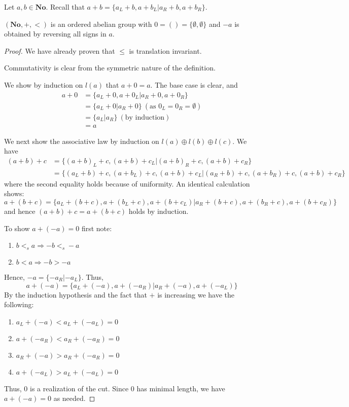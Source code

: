 

Let $a,b\in \mathbf{No}$. Recall that $a + b = \{a_L + b, a + b_L | a_R + b, a + b_R \}$.

\begin{theorem} %
$(\mathbf{No},+,<)$ is an ordered abelian group with $0 = () = \{\emptyset, \emptyset \}$ and $-a$ is obtained by reversing all signs in $a$.
\end{theorem}


\begin{proof}
We have already proven that $\leq$ is translation invariant.

Commutativity is clear from the symmetric nature of the definition.

We show by induction on $l(a)$ that $a+0 = a$. The base case is clear, and
\begin{align*}
a + 0 &= \{a_L + 0, a + 0_L | a_R + 0, a + 0_R \} \\
&= \{a_L + 0 | a_R + 0\} \ (\text{as } 0_L = 0_R = \emptyset) \\
&= \{a_L | a_R\} \ (\text{by induction}) \\
&= a
\end{align*}

We next show the associative law by induction on $l(a)\oplus l(b)\oplus l(c)$.
We have
\begin{align*}
(a+b)+c &= \{(a+b)_L + c, (a+b) + c_L | (a+b)_R + c, (a+b) + c_R \} \\
&= \{(a_L+b) + c, (a+b_L) + c, (a+b) + c_L | (a_R+b) + c, (a+b_R) + c, (a+b) + c_R\}
\end{align*}
where the second equality holds because of uniformity.
An identical calculation shows:
\[
a+(b+c) = \{a_L+ (b + c), a+ (b_L + c), a+ (b + c_L) | a_R+ (b + c), a+ (b_R + c), a+ (b + c_R)\}
\]
and hence $(a+b)+c = a+(b+c)$ holds by induction.

To show $a + (-a) = 0$ first note:
\begin{enumerate}
  \item  $b <_s a \Rightarrow -b <_s -a$
  \item  $b < a \Rightarrow -b > -a$
\end{enumerate}

Hence, $-a = \{-a_R | -a_L\}$. Thus,
\[
a + (-a) = \{a_L + (-a), a + (-a_R) | a_R + (-a), a + (-a_L) \}
\]
By the induction hypothesis and the fact that $+$ is increasing we have the following:
\begin{enumerate}
  \item  $a_L + (-a) < a_L + (-a_L) = 0$
  \item  $a + (-a_R) < a_R + (-a_R) = 0$
  \item  $a_R + (-a) > a_R + (-a_R) = 0$
  \item  $a + (-a_L) > a_L + (-a_L) = 0$
\end{enumerate}
Thus, $0$ is a realization of the cut. Since $0$ has minimal length, we have $a+(-a) = 0$ as needed.
\end{proof}

